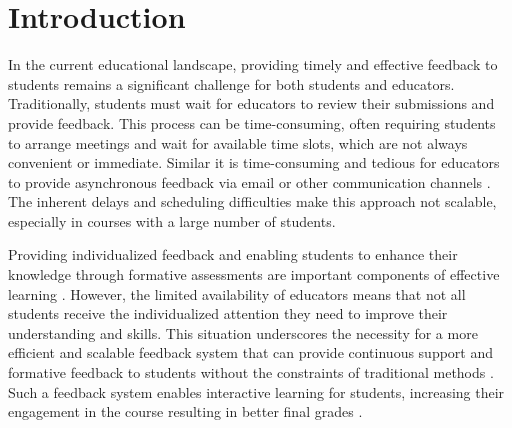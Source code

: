\documentclass[manuscript,screen,review, anonymous]{acmart}
\begin{document}



\maketitle

\section{Introduction} %


In the current educational landscape, providing timely and effective feedback to students remains a significant challenge for both students and educators.
Traditionally, students must wait for educators to review their submissions and provide feedback.
This process can be time-consuming, often requiring students to arrange meetings and wait for available time slots, which are not always convenient or immediate.
Similar it is time-consuming and tedious for educators to provide asynchronous feedback via email or other communication channels \cite{henderson:2019:ChallengesFeedbackHigher}.
The inherent delays and scheduling difficulties make this approach not scalable, especially in courses with a large number of students.

Providing individualized feedback and enabling students to enhance their knowledge through formative assessments are important components of effective learning \cite{irons:2007:EnhancingLearningFormative,higgins:2002:ConscientiousConsumerReconsidering}.
However, the limited availability of educators means that not all students receive the individualized attention they need to improve their understanding and skills.
This situation underscores the necessity for a more efficient and scalable feedback system that can provide continuous support and formative feedback to students without the constraints of traditional methods \cite{sondergaard:2004:EffectiveFeedbackSmall}.
Such a feedback system enables interactive learning for students, increasing their engagement in the course resulting in better final grades \cite{krusche:2017:InteractiveLearningIncreasing}.
\end{document}
